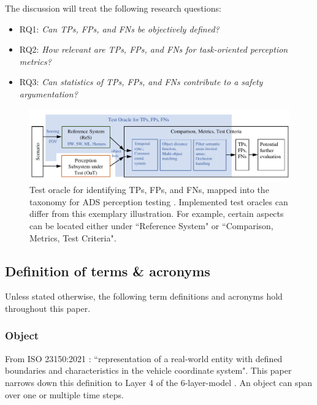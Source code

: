 \documentclass[conference]{IEEEtran}
\begin{document}





The discussion will treat the following research questions:
\begin{itemize}


\item {RQ1}: \textit{Can TPs, FPs, and FNs be objectively defined?}

\item {RQ2}: \textit{How relevant are TPs, FPs, and FNs for task-oriented perception metrics?}

\item {RQ3}: \textit{Can statistics of TPs, FPs, and FNs contribute to a safety argumentation?}
\end{itemize}

\begin{figure}[t]
	\centering
	\vspace*{2mm}
	\includegraphics[width=\textwidth]{img/taxonomy_with_oracle.pdf}
	
	\caption{Test oracle for identifying TPs, FPs, and FNs, mapped into the taxonomy for ADS perception testing \cite{Hoss2022review, stellet2015testing}. Implemented test oracles can differ from this exemplary illustration. For example, certain aspects can be located either under ``Reference System" or ``Comparison, Metrics, Test Criteria".
	}
	\label{fig:oracle_in_taxonomy}
\end{figure}


\subsection{Definition of terms \& acronyms}
Unless stated otherwise, the following term definitions and acronyms hold throughout this paper.

\subsubsection{Object} \label{def:object}
From ISO 23150:2021 \cite{ISO_23150_2021_data_communication}: 
``representation of a real-world entity with defined boundaries and characteristics in the vehicle coordinate system".
This paper narrows down this definition to Layer 4 of the 6-layer-model \cite{Scholtes20216lmAccess}. An object can span over one or multiple time steps. 
\end{document}
